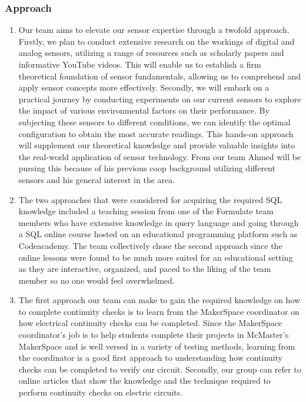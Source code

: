 \documentclass[12pt, titlepage]{article}
\begin{document}
\subsubsection{Approach}
  \begin{enumerate}
    \item Our team aims to elevate our sensor expertise through a twofold approach. Firstly, we plan to conduct extensive research on the workings of digital and analog sensors, utilizing a range of resources such as scholarly papers and informative YouTube videos. This will enable us to establish a firm theoretical foundation of sensor fundamentals, allowing us to comprehend and apply sensor concepts more effectively. Secondly, we will embark on a practical journey by conducting experiments on our current sensors to explore the impact of various environmental factors on their performance. By subjecting these sensors to different conditions, we can identify the optimal configuration to obtain the most accurate readings. This hands-on approach will supplement our theoretical knowledge and provide valuable insights into the real-world application of sensor technology. From our team Ahmed will be pursing this because of his previous coop background utilizing different sensors and his general interest in the area.
    \item The two approaches that were considered for acquiring the required SQL knowledge included a teaching session from one of the Formulate team members who have extensive knowledge in query language and going through a SQL online course hosted on an educational programming platform such as Codeacademy. The team collectively chose the second approach since the online lessons were found to be much more suited for an educational setting as they are interactive, organized, and paced to the liking of the team member so no one would feel overwhelmed.
    \item The first approach our team can make to gain the required knowledge on how to complete continuity checks is to learn from the MakerSpace coordinator on how electrical continuity checks can be completed. Since the MakerSpace coordinator's job is to help students complete their projects in McMaster's MakerSpace and is well versed in a variety of testing methods, learning from the coordinator is a good first approach to understanding how continuity checks can be completed to verify our circuit. Secondly, our group can refer to online articles that show the knowledge and the technique required to perform continuity checks on electric circuits.

\end{enumerate}
\end{document}
